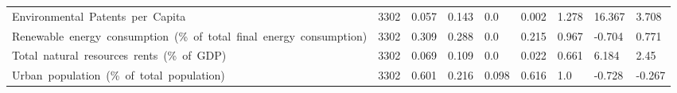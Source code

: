 \documentclass[10pt]{article}
\begin{document}
\begin{table}
\begin{adjustbox}{width=\textwidth,center}
\begin{tabular}{lllllllll}
      Environmental\ Patents\ per\ Capita & 3302 & 0.057 & 0.143 & 0.0 & 0.002 & 1.278 & 16.367 & 3.708 \\
      Renewable\ energy\ consumption\ (\%\ of\ total\ final\ energy\ consumption) & 3302 & 0.309 & 0.288 & 0.0 & 0.215 & 0.967 & -0.704 & 0.771 \\
      Total\ natural\ resources\ rents\ (\%\ of\ GDP) & 3302 & 0.069 & 0.109 & 0.0 & 0.022 & 0.661 & 6.184 & 2.45 \\
      Urban\ population\ (\%\ of\ total\ population) & 3302 & 0.601 & 0.216 & 0.098 & 0.616 & 1.0 & -0.728 & -0.267 \\
      \bottomrule
      \end{tabular}
\end{adjustbox}
\end{table}
\end{document}
